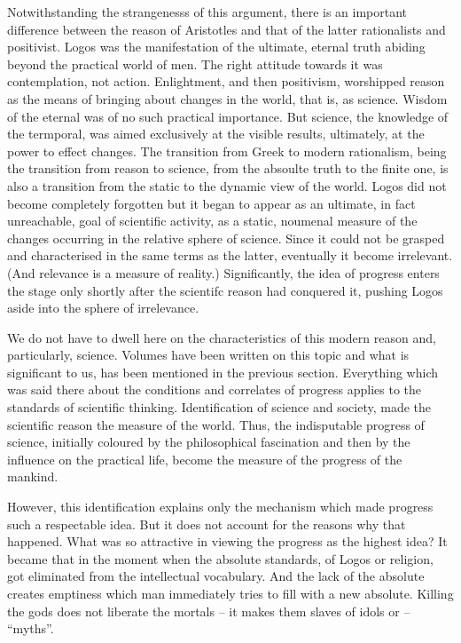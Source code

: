 Notwithstanding the strangenesss of this argument, there is an important 
difference between the reason of Aristotles and that of the latter 
rationalists and positivist. Logos was the manifestation of the ultimate,
eternal truth abiding beyond the practical world of men. The right attitude
towards it was contemplation, not action. Enlightment, and then positivism,
worshipped reason as the means of bringing about changes in the world, that
is, as science. Wisdom of the eternal was of no such practical importance.
But science, the knowledge of the termporal, was aimed exclusively at the 
visible results, ultimately, at the power to effect changes. The transition
from Greek to modern rationalism, being the transition from reason to science,
from the absoulte truth to the finite one, is also a transition from the 
static to the dynamic view of the world. Logos did not become completely
forgotten but it began to appear as an ultimate, in fact unreachable, goal
of scientific activity, as a static, noumenal measure of the changes occurring
in the relative sphere of science.
Since it could not be grasped and characterised in the same terms as the 
latter, eventually it become irrelevant. (And relevance is a measure of
reality.) Significantly, the idea of progress enters the stage only shortly
after the scientifc reason had conquered it, pushing Logos aside into the 
sphere of irrelevance.

We do not have to dwell here on the characteristics of this modern reason and,
particularly, science. Volumes have been written on this topic and what is
significant to us, has been mentioned in the previous section. Everything
which was said there about the conditions and correlates of progress applies
to the standards of scientific thinking. Identification of science and
society, made the scientific reason the measure of the world.
Thus, the indisputable progress of
science, initially coloured by the philosophical fascination and then by the 
influence on the practical life, become the measure of the progress of the 
mankind.

However, this identification explains only the mechanism which made
progress such a respectable idea. But it does not account for the reasons
why that happened. What was so attractive in viewing the progress as the 
 highest idea? 
It became that in the moment when the absolute standards,
 of Logos or religion, got eliminated from the intellectual vocabulary. 
And the lack of the absolute creates emptiness which man immediately tries to
fill with a new absolute. Killing the gods does not liberate the mortals --
it makes them slaves of idols or -- ``myths''.

